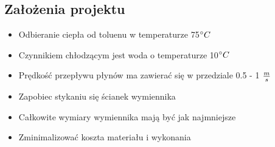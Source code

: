 \subsection{Założenia projektu}
\begin{itemize}
    \item Odbieranie ciepła od toluenu w temperaturze 75\(^\circ C\)
    \item Czynnikiem chłodzącym jest woda o temperaturze 10\(^\circ C\)
    \item Prędkość przepływu płynów ma zawierać się w przedziale 0.5 - 1 \(\frac{m}{s}\)
    \item Zapobiec stykaniu się ścianek wymiennika
    \item Całkowite wymiary wymiennika mają być jak najmniejsze
    \item Zminimalizować koszta materiału i wykonania
\end{itemize}
